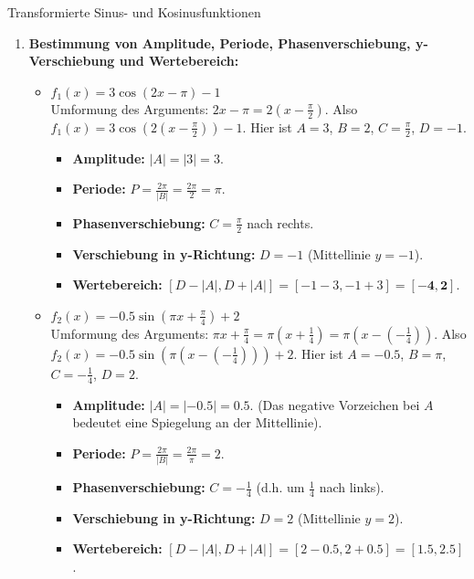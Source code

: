 \begin{loesungsumgebung}{Transformierte Sinus- und Kosinusfunktionen}

\begin{enumerate}[label=(\alph*)]
    \item \textbf{Bestimmung von Amplitude, Periode, Phasenverschiebung, y-Verschiebung und Wertebereich:}
    \begin{itemize}
        \item \textbf{$f_1(x) = 3 \cos(2x - \pi) - 1$} \\
        Umformung des Arguments: $2x - \pi = 2(x - \frac{\pi}{2})$.
        Also $f_1(x) = 3 \cos\left(2\left(x - \frac{\pi}{2}\right)\right) - 1$.
        Hier ist $A=3$, $B=2$, $C=\frac{\pi}{2}$, $D=-1$.
        \begin{itemize}
            \item \textbf{Amplitude:} $|A| = |3| = 3$.
            \item \textbf{Periode:} $P = \frac{2\pi}{|B|} = \frac{2\pi}{2} = \pi$.
            \item \textbf{Phasenverschiebung:} $C = \frac{\pi}{2}$ nach rechts.
            \item \textbf{Verschiebung in y-Richtung:} $D = -1$ (Mittellinie $y=-1$).
            \item \textbf{Wertebereich:} $[D-|A|, D+|A|] = [-1-3, -1+3] = \mathbf{[-4, 2]}$.
        \end{itemize}

        \item \textbf{$f_2(x) = -0.5 \sin(\pi x + \frac{\pi}{4}) + 2$} \\
        Umformung des Arguments: $\pi x + \frac{\pi}{4} = \pi(x + \frac{1}{4}) = \pi(x - (-\frac{1}{4}))$.
        Also $f_2(x) = -0.5 \sin\left(\pi\left(x - \left(-\frac{1}{4}\right)\right)\right) + 2$.
        Hier ist $A=-0.5$, $B=\pi$, $C=-\frac{1}{4}$, $D=2$.
        \begin{itemize}
            \item \textbf{Amplitude:} $|A| = |-0.5| = 0.5$. (Das negative Vorzeichen bei $A$ bedeutet eine Spiegelung an der Mittellinie).
            \item \textbf{Periode:} $P = \frac{2\pi}{|B|} = \frac{2\pi}{\pi} = 2$.
            \item \textbf{Phasenverschiebung:} $C = -\frac{1}{4}$ (d.h. um $\frac{1}{4}$ nach links).
            \item \textbf{Verschiebung in y-Richtung:} $D = 2$ (Mittellinie $y=2$).
            \item \textbf{Wertebereich:} $[D-|A|, D+|A|] = [2-0.5, 2+0.5] = \mathbf{[1.5, 2.5]}$.
        \end{itemize}


\end{itemize}
\end{enumerate}
\end{loesungsumgebung}
